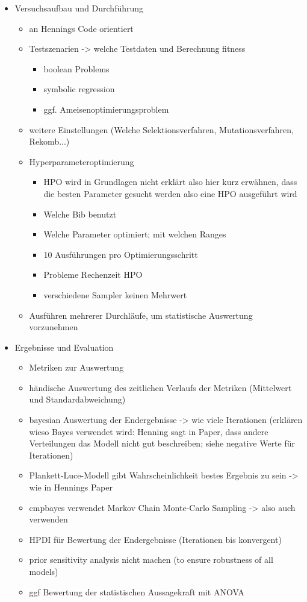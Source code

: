 \begin{itemize}
    \item Versuchsaufbau und Durchführung
    \begin{itemize}
        \item an Hennings Code orientiert
        \item Testszenarien -> welche Testdaten und Berechnung fitness
        \begin{itemize}
            \item boolean Problems
            \item symbolic regression
            \item ggf. Ameisenoptimierungsproblem
        \end{itemize}
        \item weitere Einstellungen (Welche Selektionsverfahren, Mutationsverfahren, Rekomb...)
        \item Hyperparameteroptimierung
        \begin{itemize}
        	\item HPO wird in Grundlagen nicht erklärt also hier kurz erwähnen, dass die besten Parameter gesucht werden also eine HPO ausgeführt wird
            \item Welche Bib benutzt
            \item Welche Parameter optimiert; mit welchen Ranges
            \item 10 Ausführungen pro Optimierungsschritt
            \item Probleme Rechenzeit HPO
            \item verschiedene Sampler keinen Mehrwert
        \end{itemize}
        \item Ausführen mehrerer Durchläufe, um statistische Auswertung vorzunehmen
    \end{itemize}
    \item Ergebnisse und Evaluation
    \begin{itemize}
        \item Metriken zur Auswertung
        \item händische Auswertung des zeitlichen Verlaufs der Metriken (Mittelwert und Standardabweichung)
        \item bayesian Auswertung der Endergebnisse -> wie viele Iterationen (erklären wieso Bayes verwendet wird: Henning sagt in Paper, dass andere Verteilungen das Modell nicht gut beschreiben; siehe negative Werte für Iterationen)
        \item Plankett-Luce-Modell gibt Wahrscheinlichkeit bestes Ergebnis zu sein -> wie in Hennings Paper
        \item cmpbayes verwendet Markov Chain Monte-Carlo Sampling -> also auch verwenden
        \item HPDI für Bewertung der Endergebnisse (Iterationen bis konvergent)
        \item prior sensitivity analysis nicht machen (to ensure robustness of all models)
        \item ggf Bewertung der statistischen Aussagekraft mit ANOVA
    \end{itemize}
\end{itemize}

